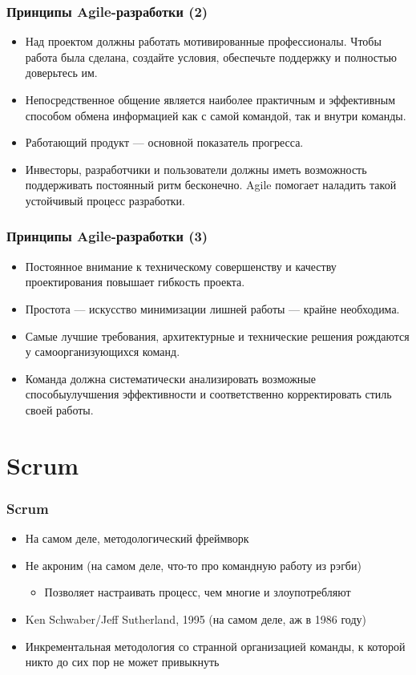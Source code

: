 \documentclass[xetex,mathserif,serif]{beamer}
\begin{document}
    \begin{frame}
        \frametitle{Принципы Agile-разработки (2)}
        \begin{itemize}
            \item Над проектом должны работать мотивированные профессионалы. Чтобы работа была сделана, создайте условия, обеспечьте поддержку и полностью доверьтесь им.
            \item Непосредственное общение является наиболее практичным и эффективным способом обмена информацией как с самой командой, так и внутри команды.
            \item Работающий продукт --- основной показатель прогресса.
            \item Инвесторы, разработчики и пользователи должны иметь возможность поддерживать постоянный ритм бесконечно. Agile помогает наладить такой устойчивый процесс разработки.
        \end{itemize}
    \end{frame}

    \begin{frame}
        \frametitle{Принципы Agile-разработки (3)}
        \begin{itemize}
            \item Постоянное внимание к техническому совершенству и качеству проектирования повышает гибкость проекта.
            \item Простота --- искусство минимизации лишней работы --- крайне необходима.
            \item Самые лучшие требования, архитектурные и технические решения рождаются у самоорганизующихся команд.
            \item Команда должна систематически анализировать возможные способыулучшения эффективности и соответственно корректировать стиль своей работы.
        \end{itemize}
    \end{frame}

    \section{Scrum}

    \begin{frame}
        \frametitle{Scrum}
        \begin{itemize}
            \item На самом деле, методологический фреймворк
            \item Не акроним (на самом деле, что-то про командную работу из рэгби)
            \begin{itemize}
                \item Позволяет настраивать процесс, чем многие и злоупотребляют
            \end{itemize}
            \item Ken Schwaber/Jeff Sutherland, 1995 (на самом деле, аж в 1986 году)
            \item Инкрементальная методология со странной организацией команды, к которой никто до сих пор не может привыкнуть
        \end{itemize}
    \end{frame}
\end{document}
